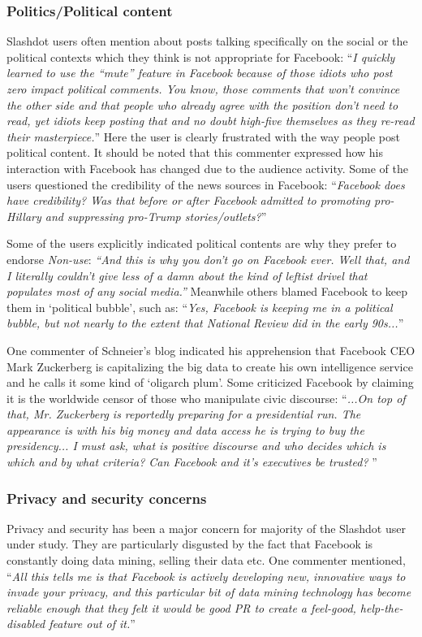  \subsubsection{Politics/Political content}
 Slashdot users often mention about posts talking specifically on the social or the political contexts which they think is not appropriate for Facebook: ``\textit{I quickly learned to use the ``mute'' feature in Facebook because of those idiots who post zero impact political comments. You know, those comments that won't convince the other side and that people who already agree with the position don't need to read, yet idiots keep posting that and no doubt high-five themselves as they re-read their masterpiece.}'' Here the user is clearly frustrated with the way people post political content. It should be noted that this commenter expressed how his interaction with Facebook has changed due to the audience activity. Some of the users questioned the credibility of the news sources in Facebook: ``\textit{Facebook does have credibility?
Was that before or after Facebook admitted to promoting pro-Hillary and suppressing pro-Trump stories/outlets?}''
    
Some of the users explicitly indicated political contents are why they prefer to endorse \emph{Non-use}: \textit{``And this is why you don't go on Facebook ever. Well that, and I literally couldn't give less of a damn about the kind of leftist drivel that populates most of any social media.''} Meanwhile others blamed Facebook to keep them in `political bubble', such as: ``\textit{Yes, Facebook is keeping me in a political bubble, but not nearly to the extent that National Review did in the early 90s...}''
    
One commenter of Schneier's blog indicated his apprehension that Facebook CEO Mark Zuckerberg is capitalizing the big data to create his own intelligence service and he calls it some kind of `oligarch plum'. Some criticized Facebook by claiming it is the worldwide censor of those who manipulate civic discourse: ``\textit{...On top of that, Mr. Zuckerberg is reportedly preparing for a presidential run. The appearance is with his big money and data access he is trying to buy the presidency... I must ask, what is positive discourse and who decides which is which and by what criteria? Can Facebook and it's executives be trusted? }''

 \subsubsection{Privacy and security concerns }
 Privacy and security has been a major concern for majority of the Slashdot user under study. They are particularly disgusted by the fact that Facebook is constantly doing data mining, selling their data etc. One commenter mentioned,
     ``\textit{All this tells me is that Facebook is actively developing new, innovative ways to invade your privacy, and this particular bit of data mining technology has become reliable enough that they felt it would be good PR to create a feel-good, help-the-disabled feature out of it.}''
     
